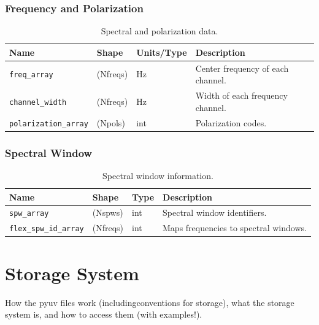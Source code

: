 \subsubsection{Frequency and Polarization}
\begin{table}[H]
\centering
\begin{tabular}{|l|l|l|l|}
\hline
\textbf{Name} & \textbf{Shape} & \textbf{Units/Type} & \textbf{Description} \\
\hline
\texttt{freq\_array} & (Nfreqs) & Hz & Center frequency of each channel. \\
\texttt{channel\_width} & (Nfreqs) & Hz & Width of each frequency channel. \\
\texttt{polarization\_array} & (Npols) & int & Polarization codes.\footnotemark[3] \\
\hline
\end{tabular}
\caption{Spectral and polarization data.}
\end{table}



\subsubsection{Spectral Window}
\begin{table}[H]
\centering
\begin{tabular}{|l|l|l|l|}
\hline
\textbf{Name} & \textbf{Shape} & \textbf{Type} & \textbf{Description} \\
\hline
\texttt{spw\_array} & (Nspws) & int & Spectral window identifiers. \\
\texttt{flex\_spw\_id\_array} & (Nfreqs) & int & Maps frequencies to spectral windows. \\
\hline
\end{tabular}
\caption{Spectral window information.}
\end{table}



\section{Storage System}

How the pyuv files work (includingconventions for storage), 
what the storage system is, and how to access them (with examples!).


